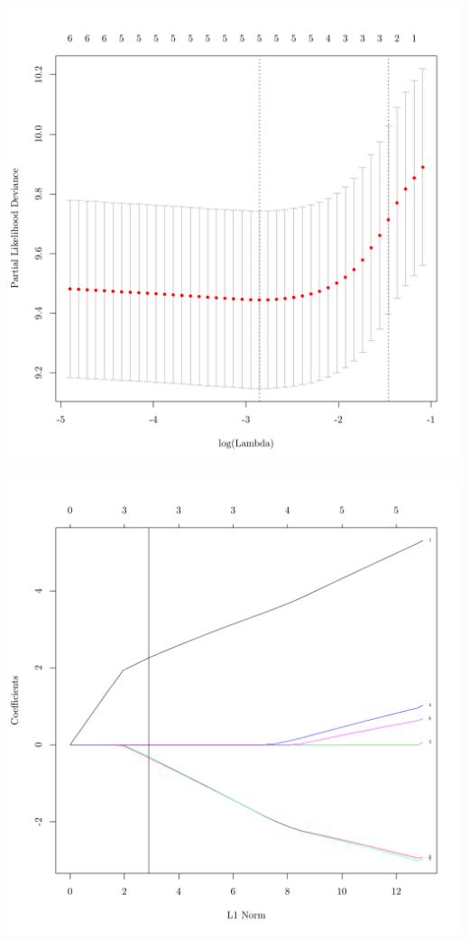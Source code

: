 \documentclass{article}
\begin{document}
\begin{knitrout}
{\centering \includegraphics[width=\maxwidth]{figure/nmf-metagene-glmnet-plots-3} 

}


\begin{kframe}\begin{alltt}
\hlopt{$}  \hlstd{=} \hlstd{)}
\hlstd{(} \hlstd{=} \hlstd{(}\hlstd{(}\hlopt{$}  \hlopt{$}
\end{alltt}
\end{kframe}

{\centering \includegraphics[width=\maxwidth]{figure/nmf-metagene-glmnet-plots-4} 

}
\end{knitrout}
\end{document}
